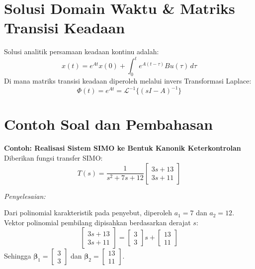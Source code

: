 \documentclass[11pt,a4paper]{article}
\begin{document}
\vspace{6pt}

\section{Solusi Domain Waktu \& Matriks Transisi Keadaan}

Solusi analitik persamaan keadaan kontinu adalah:
\begin{equation*}
    x(t) = e^{At} x(0) + \int_{0}^{t} e^{A(t - \tau)} B u(\tau) \, d\tau
\end{equation*}
Di mana matriks transisi keadaan diperoleh melalui invers Transformasi Laplace:
\begin{equation*}
    \Phi(t) = e^{At} = \mathcal{L}^{-1}\{(sI - A)^{-1}\}
\end{equation*}

\vspace{6pt}

\section{Contoh Soal dan Pembahasan}

\noindent\textbf{Contoh: Realisasi Sistem SIMO ke Bentuk Kanonik Keterkontrolan}\\
Diberikan fungsi transfer SIMO:
\begin{equation*}
    T(s) = \frac{1}{s^2 + 7s + 12} \begin{bmatrix} 3s + 13 \\ 3s + 11 \end{bmatrix}
\end{equation*}

\textit{Penyelesaian:}

Dari polinomial karakteristik pada penyebut, diperoleh $a_1 = 7$ dan $a_2 = 12$. Vektor polinomial pembilang dipisahkan berdasarkan derajat $s$:
\begin{equation*}
    \begin{bmatrix} 3s + 13 \\ 3s + 11 \end{bmatrix} = \begin{bmatrix} 3 \\ 3 \end{bmatrix} s + \begin{bmatrix} 13 \\ 11 \end{bmatrix}
\end{equation*}
Sehingga $\boldsymbol{\beta}_1 = \begin{bmatrix} 3 \\ 3 \end{bmatrix}$ dan $\boldsymbol{\beta}_2 = \begin{bmatrix} 13 \\ 11 \end{bmatrix}$.
\end{document}
